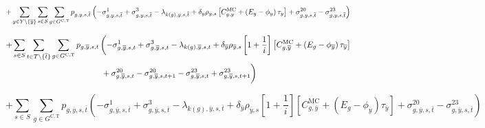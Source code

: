 \documentclass{article}
\newcommand{\sGeneratorsCandidateThermal}{G^{\mathrm{C,T}}}
\newcommand{\sYears}{Y}
\newcommand{\sScenarios}{S}
\newcommand{\sIntervals}{T}
\newcommand{\iGenerator}{g}
\newcommand{\iYear}{y}
\newcommand{\iYearTerminal}{\overline{\iYear}}
\newcommand{\iScenario}{s}
\newcommand{\iInterval}{t}
\newcommand{\iIntervalTerminal}{\overline{\iInterval}}
\newcommand{\iZone}{z}
\newcommand{\cScenarioDuration}[1][\iYear,\iScenario]{\rho_{#1}}
\newcommand{\cMarginalCost}[1][\iGenerator,\iYear]{C^{\mathrm{MC}}_{#1}}
\newcommand{\cEmissionsIntensity}[1][\iGenerator]{E_{#1}}
\newcommand{\cInterestRate}{i}
\newcommand{\cDiscountRate}[1][\iYear]{\delta_{#1}}
\newcommand{\vBaseline}[1][\iYear]{\phi_{#1}}
\newcommand{\vPermitPrice}[1][\iYear]{\tau_{#1}}
\newcommand{\vPower}[1][\iGenerator,\iYear,\iScenario,\iInterval]{p_{#1}}
\newcommand{\dMinPowerOutput}[1][\iGenerator,\iYear,\iScenario,\iInterval]{\sigma_{#1}^{1}}
\newcommand{\dMaxPowerOutputCandidateThermal}[1][\iGenerator,\iYear,\iScenario,\iInterval]{\sigma_{#1}^{3}}
\newcommand{\dRampRateUp}[1][\iGenerator,\iYear,\iScenario,\iInterval]{\sigma_{#1}^{20}}
\newcommand{\dRampRateDown}[1][\iGenerator,\iYear,\iScenario,\iInterval]{\sigma_{#1}^{23}}
\newcommand{\dPowerBalance}[1][\iZone,\iYear,\iScenario,\iInterval]{\lambda_{#1}}
\begin{document}
\begin{equation}
+ \sum\limits_{\iYear \in \sYears 
	\setminus \{\iYearTerminal\}
}\sum\limits_{\iScenario \in \sScenarios} \sum\limits_{\iGenerator \in \sGeneratorsCandidateThermal} \vPower[\iGenerator,\iYear,\iScenario,\iIntervalTerminal] \left(-\dMinPowerOutput[\iGenerator,\iYear,\iScenario,\iIntervalTerminal] + \dMaxPowerOutputCandidateThermal[\iGenerator,\iYear,\iScenario,\iIntervalTerminal] 
- \dPowerBalance[k(\iGenerator),\iYear,\iScenario,\iIntervalTerminal] + \cDiscountRate \cScenarioDuration \left[\cMarginalCost + \left(\cEmissionsIntensity - \vBaseline\right)\vPermitPrice \right] + \dRampRateUp[\iGenerator,\iYear,\iScenario,\iIntervalTerminal] - \dRampRateDown[\iGenerator,\iYear,\iScenario,\iIntervalTerminal] \right)\\
\end{equation}

\begin{align}
+ \sum\limits_{\iScenario \in \sScenarios} \sum\limits_{\iInterval \in \sIntervals \setminus \{\iIntervalTerminal\}} \sum\limits_{\iGenerator \in \sGeneratorsCandidateThermal} \vPower[\iGenerator,\iYearTerminal,\iScenario,\iInterval] & \left(-\dMinPowerOutput[\iGenerator,\iYearTerminal,\iScenario,\iInterval] + \dMaxPowerOutputCandidateThermal[\iGenerator,\iYearTerminal,\iScenario,\iInterval] - \dPowerBalance[k(\iGenerator),\iYearTerminal,\iScenario,\iInterval] + \cDiscountRate[\iYearTerminal] \cScenarioDuration[\iYearTerminal,\iScenario] \left[1 + \frac{1}{\cInterestRate}\right] \left[\cMarginalCost[\iGenerator,\iYearTerminal] + \left(\cEmissionsIntensity - \vBaseline[\iYearTerminal]\right)\vPermitPrice[\iYearTerminal] \right] \right.\nonumber\\
& \left. \vphantom{1 + \frac{1}{\cInterestRate}} + \dRampRateUp[\iGenerator,\iYearTerminal,\iScenario,\iInterval] - \dRampRateUp[\iGenerator,\iYearTerminal,\iScenario,\iInterval + 1] - \dRampRateDown[\iGenerator,\iYearTerminal,\iScenario,\iInterval] + \dRampRateDown[\iGenerator,\iYearTerminal,\iScenario,\iInterval + 1]
\right)\nonumber\\
\end{align}

\begin{equation}
+ \sum\limits_{\iScenario \in \sScenarios} \sum\limits_{\iGenerator \in \sGeneratorsCandidateThermal} \vPower[\iGenerator,\iYearTerminal,\iScenario,\iIntervalTerminal] \left(-\dMinPowerOutput[\iGenerator,\iYearTerminal,\iScenario,\iIntervalTerminal] + \dMaxPowerOutputCandidateThermal[\iGenerator,\iYearTerminal,\iScenario,\iIntervalTerminal] - \dPowerBalance[k(\iGenerator),\iYearTerminal,\iScenario,\iIntervalTerminal] + \cDiscountRate[\iYearTerminal] \cScenarioDuration[\iYearTerminal,\iScenario] \left[1 + \frac{1}{\cInterestRate}\right] \left[\cMarginalCost[\iGenerator,\iYearTerminal] + \left(\cEmissionsIntensity - \vBaseline[\iYearTerminal]\right)\vPermitPrice[\iYearTerminal] \right] + \dRampRateUp[\iGenerator,\iYearTerminal,\iScenario,\iIntervalTerminal] - \dRampRateDown[\iGenerator,\iYearTerminal,\iScenario,\iIntervalTerminal] \right)
\end{equation}
\end{document}
